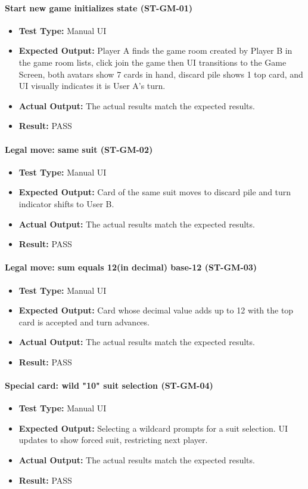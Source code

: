 \documentclass[12pt, titlepage]{article}
\begin{document}
\paragraph{Start new game initializes state (ST-GM-01)}
\begin{itemize}
  \item \textbf{Test Type:} Manual UI
  \item \textbf{Expected Output:} Player A finds the game room created by Player B in the game room lists, click join the game then UI transitions to the Game Screen, both avatars show 7 cards in hand, discard pile shows 1 top card, and UI visually indicates it is User A's turn.
  \item \textbf{Actual Output:} The actual results match the expected results.
  \item \textbf{Result:} PASS
\end{itemize}

\paragraph{Legal move: same suit (ST-GM-02)}
\begin{itemize}
  \item \textbf{Test Type:} Manual UI
  \item \textbf{Expected Output:} Card of the same suit moves to discard pile and turn indicator shifts to User B.
  \item \textbf{Actual Output:} The actual results match the expected results.
  \item \textbf{Result:} PASS
\end{itemize}

\paragraph{Legal move: sum equals 12(in decimal) base-12 (ST-GM-03)}
\begin{itemize}
  \item \textbf{Test Type:} Manual UI
  \item \textbf{Expected Output:} Card whose decimal value adds up to 12 with the top card is accepted and turn advances.
  \item \textbf{Actual Output:} The actual results match the expected results.
  \item \textbf{Result:} PASS
\end{itemize}

\paragraph{Special card: wild "10" suit selection (ST-GM-04)}
\begin{itemize}
  \item \textbf{Test Type:} Manual UI
  \item \textbf{Expected Output:} Selecting a wildcard prompts for a suit selection. UI updates to show forced suit, restricting next player.
  \item \textbf{Actual Output:} The actual results match the expected results.
  \item \textbf{Result:} PASS
\end{itemize}
\end{document}
